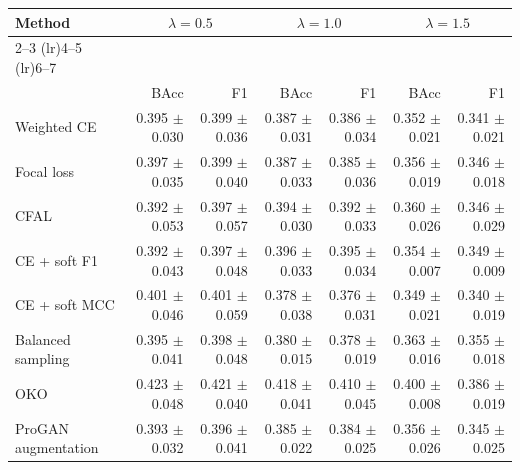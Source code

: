 \begin{tabular}{lrrrrrr}
\toprule
Method & \multicolumn{2}{c}{$\lambda=0.5$} & \multicolumn{2}{c}{$\lambda=1.0$} & \multicolumn{2}{c}{$\lambda=1.5$} \\ \cmidrule(lr){2--3} \cmidrule(lr){4--5} \cmidrule(lr){6--7}\\
 & BAcc & F1 & BAcc & F1 & BAcc & F1\\
\midrule
Weighted CE & \num{0.395} $\pm$ \num{0.030} & \num{0.399} $\pm$ \num{0.036} & \num{0.387} $\pm$ \num{0.031} & \num{0.386} $\pm$ \num{0.034} & \num{0.352} $\pm$ \num{0.021} & \num{0.341} $\pm$ \num{0.021}\\
Focal loss & \num{0.397} $\pm$ \num{0.035} & \num{0.399} $\pm$ \num{0.040} & \num{0.387} $\pm$ \num{0.033} & \num{0.385} $\pm$ \num{0.036} & \num{0.356} $\pm$ \num{0.019} & \num{0.346} $\pm$ \num{0.018}\\
CFAL & \num{0.392} $\pm$ \num{0.053} & \num{0.397} $\pm$ \num{0.057} & \num{0.394} $\pm$ \num{0.030} & \num{0.392} $\pm$ \num{0.033} & \num{0.360} $\pm$ \num{0.026} & \num{0.346} $\pm$ \num{0.029}\\
CE + soft F1 & \num{0.392} $\pm$ \num{0.043} & \num{0.397} $\pm$ \num{0.048} & \num{0.396} $\pm$ \num{0.033} & \num{0.395} $\pm$ \num{0.034} & \num{0.354} $\pm$ \num{0.007} & \num{0.349} $\pm$ \num{0.009}\\
CE + soft MCC & \num{0.401} $\pm$ \num{0.046} & \num{0.401} $\pm$ \num{0.059} & \num{0.378} $\pm$ \num{0.038} & \num{0.376} $\pm$ \num{0.031} & \num{0.349} $\pm$ \num{0.021} & \num{0.340} $\pm$ \num{0.019}\\
Balanced sampling & \num{0.395} $\pm$ \num{0.041} & \num{0.398} $\pm$ \num{0.048} & \num{0.380} $\pm$ \num{0.015} & \num{0.378} $\pm$ \num{0.019} & \num{0.363} $\pm$ \num{0.016} & \num{0.355} $\pm$ \num{0.018}\\
OKO & \num{0.423} $\pm$ \num{0.048} & \num{0.421} $\pm$ \num{0.040} & \num{0.418} $\pm$ \num{0.041} & \num{0.410} $\pm$ \num{0.045} & \num{0.400} $\pm$ \num{0.008} & \num{0.386} $\pm$ \num{0.019}\\
ProGAN augmentation & \num{0.393} $\pm$ \num{0.032} & \num{0.396} $\pm$ \num{0.041} & \num{0.385} $\pm$ \num{0.022} & \num{0.384} $\pm$ \num{0.025} & \num{0.356} $\pm$ \num{0.026} & \num{0.345} $\pm$ \num{0.025}\\
\bottomrule
\end{tabular}
